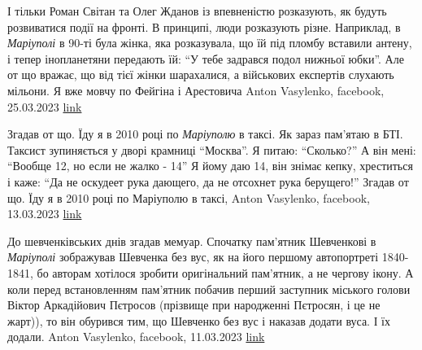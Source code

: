  
 
 
 
 

І тільки Роман Світан та Олег Жданов із впевненістю розказують, як будуть
розвиватися події на фронті. В принципі, люди розказують різне. Наприклад, в
\emph{Маріуполі} в 90-ті була жінка, яка розказувала, що їй під пломбу вставили
антену, і тепер інопланетяни передають їй: \enquote{У тебе задрався подол
нижньої юбки}.  Але от що вражає, що від тієї жінки шарахалися, а військових
експертів слухають мільони. Я вже мовчу по Фейгіна і Арестовича
Anton Vasylenko, facebook, 25.03.2023
\href{https://www.facebook.com/anton.vasylenko.338/posts/pfbid0uSR5M5PRsaowMmWdz9wL4V3aDtxc6RJ4XeCAX2eFUt4Tgv6t1XUPmf3EGqL7JXQzl}{link}

Згадав от що. Їду я в 2010 році по \emph{Маріуполю} в таксі. Як зараз пам'ятаю в
БТІ. Таксист зупиняється у дворі крамниці \enquote{Москва}. Я питаю: \enquote{Сколько?} А він
мені: \enquote{Вообще 12, но если не жалко - 14}
Я йому даю 14, він знімає кепку, хреститься і каже: \enquote{Да не оскудеет
рука дающего, да не отсохнет рука берущего!}
Згадав от що. Їду я в 2010 році по Маріуполю в таксі, Anton Vasylenko, facebook, 13.03.2023
\href{https://www.facebook.com/anton.vasylenko.338/posts/pfbid02dVWpLhH3v8adQdFZxSYkaiuKN7yez1twtt6seahzHeWzSPr9Wzo5Vw2uZ37on8g5l}{link}

До шевченківських днів згадав мемуар. Спочатку пам'ятник Шевченкові в
\emph{Маріуполі} зображував Шевченка без вус, як на його першому автопортреті
1840-1841, бо авторам хотілося зробити оригінальний пам'ятник, а не чергову
ікону. А коли перед встановленням пам'ятник побачив перший заступник міського
голови Віктор Аркадійович Пєтросов (прізвище при народженні Пєтросян, і це не
жарт)), то він обурився тим, що Шевченко без вус і наказав додати вуса. І їх
додали.
Anton Vasylenko, facebook, 11.03.2023
\href{https://www.facebook.com/anton.vasylenko.338/posts/pfbid0MQkZqhM2Jn27AhqJAXJKjzgfKznF7XbPnFkJWZxHbEESQoKhXBQfGQPusLnABfFWl}{link}
